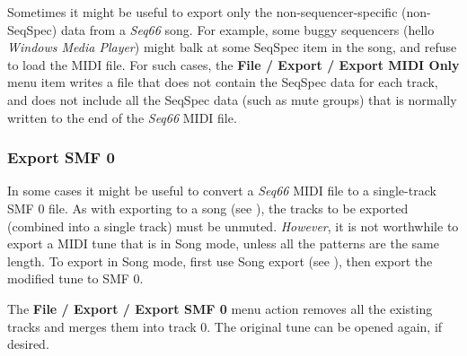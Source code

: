    Sometimes it might be useful to export only the non-sequencer-specific
   (non-SeqSpec) data from a \textsl{Seq66} song.
   For example, some buggy sequencers
   (hello \textsl{Windows Media Player})
   might balk at some SeqSpec item in the song, and refuse to load the MIDI
   file.
   For such cases,
   the \textbf{File / Export / Export MIDI Only} menu
   item writes a file that does not contain
   the SeqSpec data for each track, and does not include all the SeqSpec data
   (such as mute groups) that is normally written to the end of the
   \textsl{Seq66} MIDI file.

\subsubsection{Export SMF 0}
\label{subsubsec:midi_export_file_export_smf_0}

   In some cases it might be useful to convert a \textsl{Seq66} MIDI file to a
   single-track SMF 0 file.
   As with exporting to a song
   (see ),
   the tracks to be exported (combined into a single track) must be unmuted.
   \textsl{However}, it is not worthwhile to export a MIDI tune
   that is in Song mode, unless all the patterns are the same length.
   To export in Song mode, first use Song export (see
   ), then export the modified
   tune to SMF 0.

   The \textbf{File / Export / Export SMF 0 } menu
   action removes all the existing tracks and merges them into track 0.
   The original tune can be opened again, if desired.

